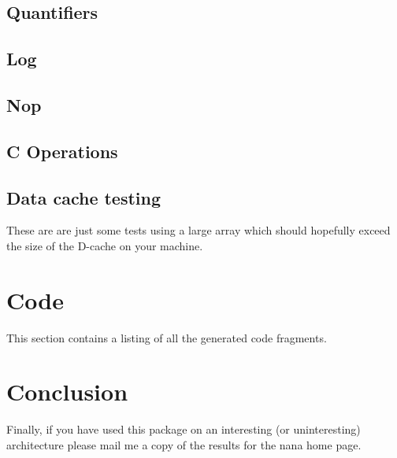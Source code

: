 \documentclass[a4paper]{article}
\begin{document}
\subsection{Quantifiers}


\subsection{Log}


\subsection{Nop}


\subsection{C Operations}


\subsection{Data cache testing}
These are are just some tests using a large array which should
hopefully exceed the size of the D-cache on your machine.



\section{Code}
This section contains a listing of all the generated code fragments. 

\begin{itemize}

\end{itemize}

\section{Conclusion}
Finally, if you have used this package on an interesting (or
uninteresting) architecture please mail me a copy of the results for
the nana home page. 
\end{document}
